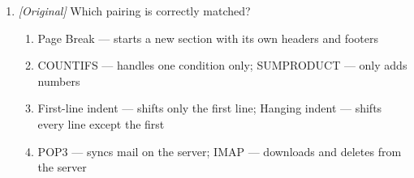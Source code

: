 \documentclass[11pt]{article}
\begin{document}
\begin{enumerate}[label=\textbf{Q\arabic*.}, leftmargin=*]
  \begin{enumerate}[label=\Roman*.]
    \item A Section Break, not a Page Break, allows different headers and
      footers in one document.
    \item Addresses in the Bcc field are hidden from the sender.
    \item A digital signature encrypts the message body for confidentiality.
  \end{enumerate}
  \begin{enumerate}[label=\Alph*.]
    \item I only
    \item I and II only
    \item II and III only
    \item I, II, and III
  \end{enumerate}
\item \textit{[Original]} Which pairing is correctly matched?
  \begin{enumerate}[label=\Alph*.]
    \item Page Break --- starts a new section with its own headers and
      footers
    \item COUNTIFS --- handles one condition only; SUMPRODUCT --- only adds
      numbers
    \item First-line indent --- shifts only the first line; Hanging indent
      --- shifts every line except the first
    \item POP3 --- syncs mail on the server; IMAP --- downloads and deletes
      from the server
  \end{enumerate}


\end{enumerate}
\end{document}
